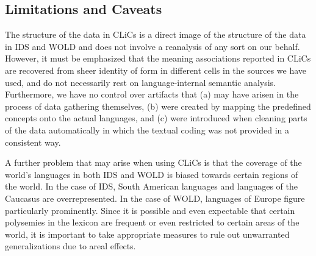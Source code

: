 \subsection{Limitations and Caveats}
The structure of the data in CLiCs is a direct image of the structure of the data in IDS and WOLD
and does not involve a reanalysis of any sort on our behalf. However, it must be emphasized that the
meaning associations reported in CLiCs are recovered from sheer identity of form in different cells
in the sources we have used, and do not necessarily rest on language-internal semantic analysis.
Furthermore, we have no control over artifacts that (a) may have arisen in the process of data
gathering themselves, (b) were created by mapping the predefined concepts onto the actual languages,
and (c) were introduced when cleaning parts of the data automatically in which the textual coding
was not provided in a consistent way.
 
A further problem that may arise when using CLiCs is that the coverage of the world’s languages in
both IDS and WOLD is biased towards certain regions of the world. In the case of IDS, South American
languages and languages of the Caucasus are overrepresented. In the case of WOLD, languages of
Europe figure particularly prominently. Since it is possible and even expectable that certain
polysemies in the lexicon are frequent or even restricted to certain areas of the world, it is
important to take appropriate measures to rule out unwarranted generalizations due to areal
effects.

